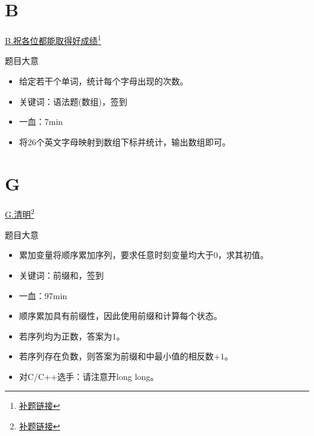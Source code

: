 \documentclass{beamer}
\begin{document}
    \section{B}
    \hypertarget{B}{}
    \begin{frame}{\hyperlink{toc}{B.祝各位都能取得好成绩}\footnote{\href{https://acm816.cn/p/237}{\underline{补题链接}}}}
        \begin{block}{题目大意}
            \begin{itemize}
                \item 给定若干个单词，统计每个字母出现的次数。
                \item 关键词：语法题(数组)，签到
                \item 一血：7min
            \end{itemize}
        \end{block}
        \begin{itemize}
            \item 将26个英文字母映射到数组下标并统计，输出数组即可。
        \end{itemize}
    \end{frame}
    \section{G}
    \hypertarget{G}{}
    \begin{frame}{\hyperlink{toc}{G.清明}\footnote{\href{https://acm816.cn/p/242}{\underline{补题链接}}}}
        \begin{block}{题目大意}
            \begin{itemize}
                \item 累加变量将顺序累加序列，要求任意时刻变量均大于$0$，求其初值。
                \item 关键词：前缀和，签到
                \item 一血：97min
            \end{itemize}
        \end{block}
        \begin{itemize}
            \item 顺序累加具有前缀性，因此使用前缀和计算每个状态。
            \item 若序列均为正数，答案为$1$。
            \item 若序列存在负数，则答案为前缀和中最小值的相反数$+1$。
            \item 对C/C++选手：请注意开long long。
        \end{itemize}
    \end{frame}
\end{document}
